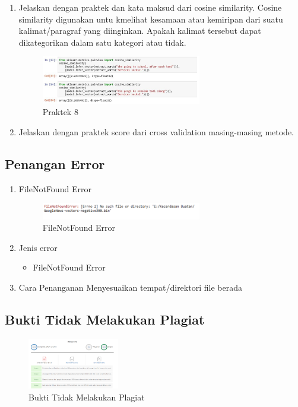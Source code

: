 \begin{enumerate}
	\item Jelaskan dengan praktek dan kata maksud dari cosine similarity.
	Cosine similarity digunakan untu kmelihat kesamaan atau kemiripan dari suatu kalimat/paragraf yang diinginkan. Apakah kalimat tersebut dapat dikategorikan dalam satu kategori atau tidak.
	\hfill\break
	
		\begin{figure}[H]
			\includegraphics[width=7cm]{figures/1174077/5/p4r.png}
			\centering
			\caption{Praktek 8}
		\end{figure}
	\item Jelaskan dengan praktek score dari cross validation masing-masing metode.
		
\end{enumerate}
\subsection{Penangan Error}
\begin{enumerate}
	\item FileNotFound Error
	\hfill\break
		\begin{figure}[H]
			\includegraphics[width=7cm]{figures/1174077/5/error.png}
			\centering
			\caption{FileNotFound Error}
		\end{figure}
	\item Jenis error
	\begin{itemize}
		\item FileNotFound Error
	\end{itemize}
	\item Cara Penanganan
	\hfill\break
	Menyesuaikan tempat/direktori file berada
\end{enumerate}
\subsection{Bukti Tidak Melakukan Plagiat}
\hfill\break
\begin{figure}[H]
	\includegraphics[width=4cm]{figures/1174077/5/plagiat.png}
	\centering
	\caption{Bukti Tidak Melakukan Plagiat}
\end{figure}
